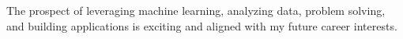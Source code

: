 The prospect of leveraging machine learning, analyzing data, problem solving,
and building applications is exciting and aligned with my future career
interests.
